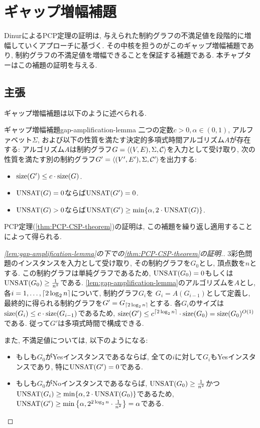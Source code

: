\chapter{ギャップ増幅補題} \label{chap:gap-amplification}

DinurによるPCP定理の証明は, 与えられた制約グラフの不満足値を段階的に増幅していくアプローチに基づく.
その中核を担うのがこのギャップ増幅補題であり, 制約グラフの不満足値を増幅できることを保証する補題である.
本チャプターはこの補題の証明を与える.

\section{主張}
ギャップ増幅補題は以下のように述べられる.

\begin{lemma}{ギャップ増幅補題}{gap-amplification-lemma}
  二つの定数$c>0,\alpha\in (0,1)$, アルファベット$\Sigma$, および以下の性質を満たす決定的多項式時間アルゴリズム$A$が存在する: 
  アルゴリズム$A$は制約グラフ$G=\langle(V,E),\Sigma,\mathcal{C}\rangle$を入力として受け取り, 次の性質を満たす別の制約グラフ$G'=\langle(V',E'),\Sigma,\mathcal{C}'\rangle$を出力する:
  \begin{itemize}
    \item $\mathrm{size}(G')\le c\cdot \mathrm{size}(G)$.
    \item $\mathrm{UNSAT}(G)=0$ならば$\mathrm{UNSAT}(G')=0$.
    \item $\mathrm{UNSAT}(G)>0$ならば$\mathrm{UNSAT}(G')\ge \min\{\alpha, 2\cdot \mathrm{UNSAT}(G)\}$.
  \end{itemize}
\end{lemma}

PCP定理(\cref{thm:PCP-CSP-theorem})の証明は, この補題を繰り返し適用することによって得られる.

\begin{proof}[\cref{lem:gap-amplification-lemma}の下での\cref{thm:PCP-CSP-theorem}の証明.]
  3彩色問題のインスタンスを入力として受け取り, その制約グラフを$G_0$とし, 頂点数を$n$とする.
  この制約グラフは単純グラフであるため, $\mathrm{UNSAT}(G_0)=0$もしくは$\mathrm{UNSAT}(G_0)\ge \frac{1}{n^2}$である.
  \cref{lem:gap-amplification-lemma}のアルゴリズムを$A$とし, 各$i=1,\dots,\lceil2\log_2 n\rceil$について, 制約グラフ$G_i$を
  $G_i = A(G_{i-1})$として定義し, 最終的に得られる制約グラフを$G'=G_{\lceil2\log_2 n\rceil}$とする.
  各$G_i$のサイズは$\mathrm{size}(G_i) \le c\cdot \mathrm{size}(G_{i-1})$であるため, $\mathrm{size}(G')\le c^{\lceil2\log_2 n\rceil}\cdot \mathrm{size}(G_0)=\mathrm{size}(G_0)^{O(1)}$である.
  従って$G'$は多項式時間で構成できる.

  また, 不満足値については, 以下のようになる:
  \begin{itemize}
  \item もしも$G_0$がYesインスタンスであるならば, 全ての$i$に対して$G_i$もYesインスタンスであり, 特に$\mathrm{UNSAT}(G')=0$である.
  \item もしも$G_0$がNoインスタンスであるならば, $\mathrm{UNSAT}(G_0)\ge \frac{1}{n^2}$かつ$\mathrm{UNSAT}(G_i)\ge \min\{\alpha, 2\cdot \mathrm{UNSAT}(G_0)\}$であるため, $\mathrm{UNSAT}(G')\ge \min\qty{\alpha, 2^{2\log_2 n}\cdot \frac{1}{n^2}}=\alpha$である.
  \end{itemize}
\end{proof}


